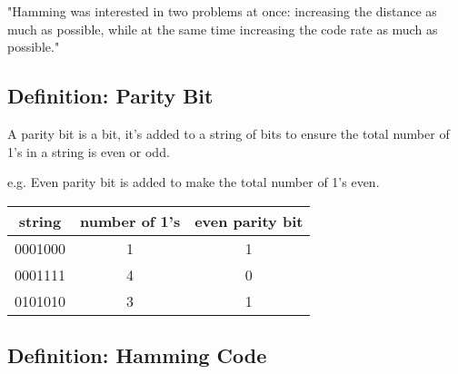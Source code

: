 \documentclass[12pt]{article}
\begin{document}
\begin{center}
  "Hamming was interested in two problems at once: increasing the distance as much as possible, while at the same time increasing the code rate as much as possible."
\end{center}

\subsection{Definition: Parity Bit}
A parity bit is a bit, it's added to a string of bits to ensure the total number of 1's in a string is even or odd. 

e.g. Even parity bit is added to make the total number of 1's even. 

\begin{center}
  \begin{tabular}{ c | c | c }
   string & number of 1's & even parity bit \\ 
   \hline
   0001000 & 1 & 1 \\  
   0001111 & 4 & 0 \\
   0101010 & 3 & 1     
  \end{tabular}
\end{center}

\subsection{Definition: Hamming Code}
    
\end{document}
